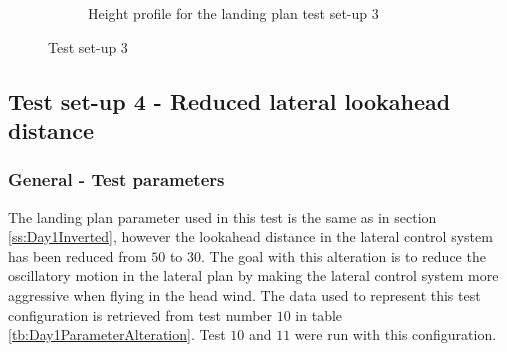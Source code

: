 \begin{figure}[H]
\begin{subfigure}{0.7\textwidth}
\caption{Height profile for the landing plan test set-up 3}
\label{Fig:Height31mai125420}
\end{subfigure}
\caption{Test set-up 3}
\label{Fig:Test3}
\end{figure}

\subsection{Test set-up 4 - Reduced lateral lookahead distance}\label{ss:Day1:ReducedLookahead}
\subsubsection{General - Test parameters}
The landing plan parameter used in this test is the same as in section \ref{ss:Day1Inverted}, however the lookahead distance in the lateral control system has been reduced from $50$ to $30$. The goal with this alteration is to reduce the oscillatory motion in the lateral plan by making the lateral control system more aggressive when flying in the head wind. The data used to represent this test configuration is retrieved from test number $10$ in table \ref{tb:Day1ParameterAlteration}. Test $10$ and $11$ were run with this configuration.

